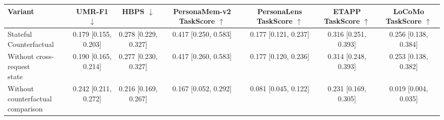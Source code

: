 \begin{table}[t]
\centering
\footnotesize
\setlength{\tabcolsep}{2pt}
\begin{tabular}{lcccccc}
\toprule
Variant & UMR-F1 $\downarrow$ & HBPS $\downarrow$ & \shortstack{PersonaMem-v2\\TaskScore $\uparrow$} & \shortstack{PersonaLens\\TaskScore $\uparrow$} & \shortstack{ETAPP\\TaskScore $\uparrow$} & \shortstack{LoCoMo\\TaskScore $\uparrow$} \\
\midrule
Stateful Counterfactual & 0.179 [0.155, 0.203] & 0.278 [0.229, 0.327] & 0.417 [0.250, 0.583] & 0.177 [0.121, 0.237] & 0.316 [0.251, 0.393] & 0.256 [0.138, 0.384] \\
\shortstack[l]{Without cross-request\\state} & 0.190 [0.165, 0.214] & 0.277 [0.230, 0.327] & 0.417 [0.260, 0.583] & 0.177 [0.120, 0.236] & 0.314 [0.248, 0.393] & 0.253 [0.138, 0.382] \\
\shortstack[l]{Without counterfactual\\comparison} & 0.242 [0.211, 0.272] & 0.216 [0.169, 0.267] & 0.167 [0.052, 0.292] & 0.081 [0.045, 0.122] & 0.231 [0.169, 0.305] & 0.019 [0.004, 0.035] \\
\bottomrule
\end{tabular}
\end{table}
